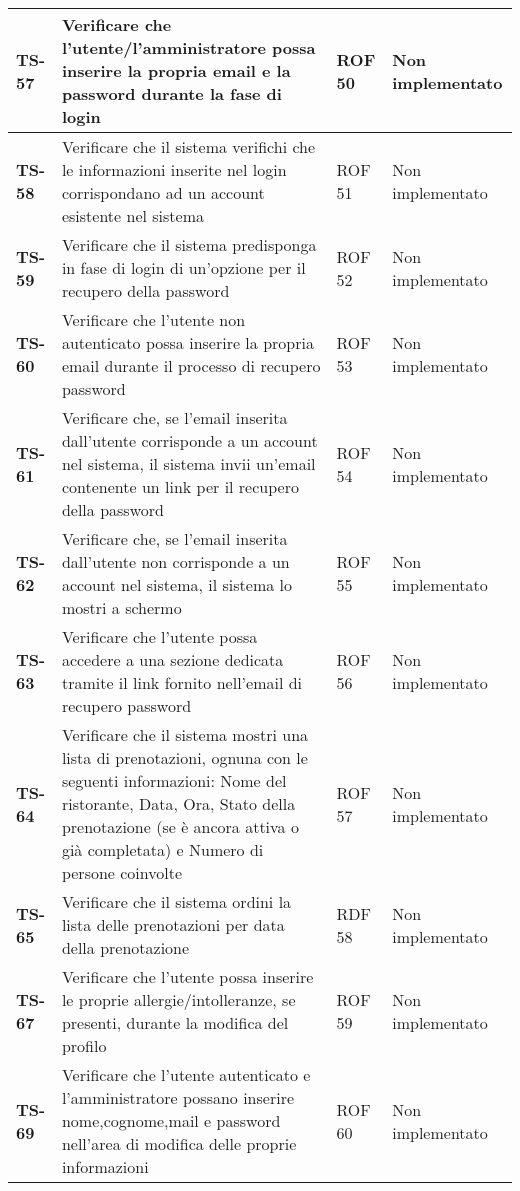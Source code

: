 \begin{longtable}{|>{\centering\arraybackslash}p{1.5cm}|p{9.8cm}|p{2cm}|p{3.5cm}|}
    \textbf{TS-57} & Verificare che l'utente/l'amministratore possa inserire la propria email e la password durante la fase di login & ROF 50 & Non implementato \\ 
    \hline
    \rowcolor{gray!10}
    \textbf{TS-58} & Verificare che il sistema verifichi che le informazioni inserite nel login corrispondano ad un account esistente nel sistema & ROF 51 & Non implementato \\ 
    \hline
    \rowcolor{gray!10}
    \textbf{TS-59} & Verificare che il sistema predisponga in fase di login di un'opzione per il recupero della password & ROF 52 & Non implementato \\ 
    \hline
    \rowcolor{gray!10}
    \textbf{TS-60} & Verificare che l'utente non autenticato possa inserire la propria email durante il processo di recupero password & ROF 53 & Non implementato \\ 
    \hline
    \rowcolor{gray!10}
    \textbf{TS-61} & Verificare che, se l'email inserita dall'utente corrisponde a un account nel sistema, il sistema invii un'email contenente un link per il recupero della password & ROF 54 & Non implementato \\
    \hline
    \rowcolor{gray!10}
    \textbf{TS-62} & Verificare che, se l'email inserita dall'utente non corrisponde a un account nel sistema, il sistema lo mostri a schermo & ROF 55 & Non implementato \\ 
    \hline
    \rowcolor{gray!10}
    \textbf{TS-63} & Verificare che l'utente possa accedere a una sezione dedicata tramite il link fornito nell'email di recupero password & ROF 56 & Non implementato \\ 
    \hline
    \rowcolor{gray!10}
    \textbf{TS-64} & Verificare che il sistema mostri una lista di prenotazioni, ognuna con le seguenti informazioni:
    Nome del ristorante, Data, Ora, Stato della prenotazione (se è ancora attiva o già completata) e Numero di persone coinvolte & ROF 57 & Non implementato \\
    \hline
    \rowcolor{gray!10}
    \textbf{TS-65} & Verificare che il sistema ordini la lista delle prenotazioni per data della prenotazione & RDF 58 & Non implementato \\ 
    \hline
    \rowcolor{gray!10}
    \textbf{TS-67} & Verificare che l'utente possa inserire le proprie allergie/intolleranze, se presenti, durante la modifica del profilo & ROF 59 & Non implementato \\ 
    \hline
    \rowcolor{gray!10}
    \textbf{TS-69} & Verificare che l'utente autenticato e l'amministratore possano inserire nome,cognome,mail e password nell'area di modifica delle proprie informazioni & ROF 60 & Non implementato \\ 

\end{longtable}
